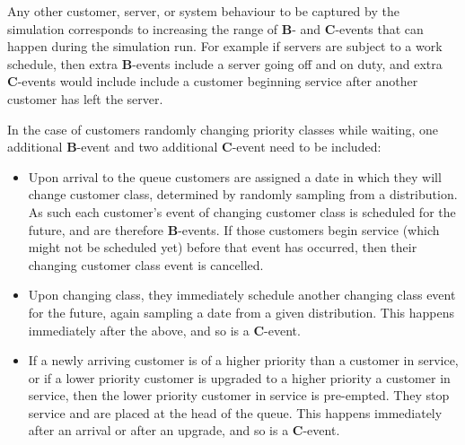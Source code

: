 \documentclass{article}
\begin{document}
Any other customer, server, or system behaviour to be captured by the simulation
corresponds to increasing the range of \textbf{B}- and \textbf{C}-events that
can happen during the simulation run. For example if servers are subject to a
work schedule, then extra \textbf{B}-events include a server going off and on
duty, and extra \textbf{C}-events would include include a customer beginning
service after another customer has left the server.

In the case of customers randomly changing priority classes while waiting, one
additional \textbf{B}-event and two additional \textbf{C}-event need to be
included:

\begin{itemize}
  \item Upon arrival to the queue customers are assigned a date in which they
  will change customer class, determined by randomly sampling from a
  distribution. As such each customer's event of changing customer class is
  scheduled for the future, and are therefore \textbf{B}-events. If those
  customers begin service (which might not be scheduled yet) before that event
  has occurred, then their changing customer class event is cancelled.
  \item Upon changing class, they immediately schedule another changing class
  event for the future, again sampling a date from a given distribution. This
  happens immediately after the above, and so is a \textbf{C}-event.
  \item If a newly arriving customer is of a higher priority than a customer in
  service, or if a lower priority customer is upgraded to a higher priority a
  customer in service, then the lower priority customer in service is
  pre-empted. They stop service and are placed at the head of the queue. This
  happens immediately after an arrival or after an upgrade, and so is a
  \textbf{C}-event.
\end{itemize}
\end{document}
